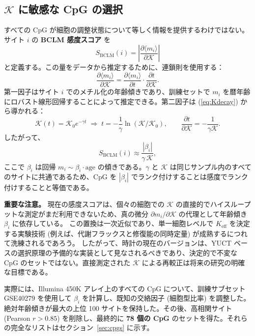 \documentclass[12pt,a4paper]{ltjsarticle}
\newcommand{\REL}{\mathcal{K}}          %
\begin{document}
	\subsection{\(\REL\) に敏感な CpG の選択}
	すべての CpG が細胞の調整状態について等しく情報を提供するわけではない。サイト \(i\) の \textbf{BCLM 感度スコア} を
	\begin{equation}
		S_{\mathrm{BCLM}}(i) = \left| \frac{\partial \langle m_i \rangle}{\partial \REL} \right|
		\label{eq:sensitivity}
	\end{equation}
	と定義する。この量をデータから推定するために、連鎖則を使用する：
	\[
	\frac{\partial \langle m_i \rangle}{\partial \REL} = \frac{\partial \langle m_i \rangle}{\partial t} \cdot \frac{\partial t}{\partial \REL}.
	\]
	第一因子はサイト \(i\) でのメチル化の年齢傾きであり、訓練セットで \(m_i\) を暦年齢にロバスト線形回帰することによって推定できる。第二因子は (\ref{eq:Kdecay}) から導かれる：
	\[
	\REL(t) = \REL_0 e^{-\gamma t} \;\Longrightarrow\; t = -\frac{1}{\gamma}\ln(\REL/\REL_0),\qquad
	\frac{\partial t}{\partial \REL} = -\frac{1}{\gamma \REL}.
	\]
	したがって、
	\[
	S_{\mathrm{BCLM}}(i) \approx \frac{|\beta_i|}{\gamma \, \REL},
	\]
	ここで \(\beta_i\) は回帰 \(m_i \sim \beta_i \cdot \text{age}\) の傾きである。\(\gamma\) と \(\REL\) は同じサンプル内のすべてのサイトに共通であるため、CpG を \(|\beta_i|\) でランク付けすることは感度でランク付けすることと等価である。
	
	\textbf{重要な注意。}
	現在の感度スコアは、個々の細胞での \(\REL\) の直接的でハイスループットな測定がまだ利用できないため、真の微分 \(\partial m_i/\partial \REL\) の代理として年齢傾き \(\beta_i\) に依存している。
	この置換は一次近似であり、単一細胞レベルで \(K_{\mathrm{eff}}\) を決定する実験技術 (例えば、代謝フラックスと修復能の同時定量) が成熟するにつれて洗練されるであろう。
	したがって、時計の現在のバージョンは、YUCT ベースの選択原理の予備的な実装として見なされるべきであり、決定的で不変な CpG のセットではない。直接測定された \(\REL\) による再較正は将来の研究の明確な目標である。
	
	実際には、Illumina 450K アレイ上のすべての CpG について、訓練サブセット GSE40279 を使用して \(\beta_i\) を計算し、既知の交絡因子 (細胞型比率) を調整した。絶対年齢傾きが最大の上位 100 サイトを保持した。その後、高相関サイト (Pearson \(r > 0.85\)) を削除し、最終的に \textbf{78 個の CpG} のセットを得た。それらの完全なリストはセクション~\ref{sec:cpgs} に示す。
	
\end{document}
